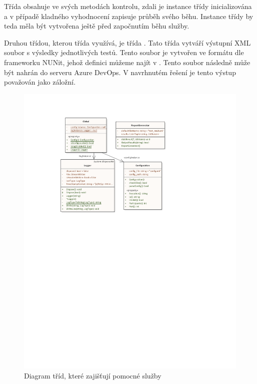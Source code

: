 Třída  obsahuje ve svých metodách kontrolu, zdali je instance třídy  inicializována a v případě kladného vyhodnocení zapisuje průběh svého běhu. Instance třídy  by teda měla být vytvořena ještě před započnutím běhu služby.

Druhou třídou, kterou třída  využívá, je třída . Tato třída vytváří výstupní XML soubor s výsledky jednotlivých testů.
Tento soubor je vytvořen ve formátu dle frameworku NUNit, jehož definici můžeme najít v \cite{nunit}. Tento soubor následně může být nahrán do serveru Azure DevOps. V navrhnutém řešení je tento výstup považován jako záložní.

\begin{figure}[htbp]
    \centering 
    \includegraphics[width=\textwidth]{assets/img/class_diagram/utility.pdf}
    \caption{Diagram tříd, které zajišťují pomocné služby}
    \label{fig:utility}
\end{figure}


